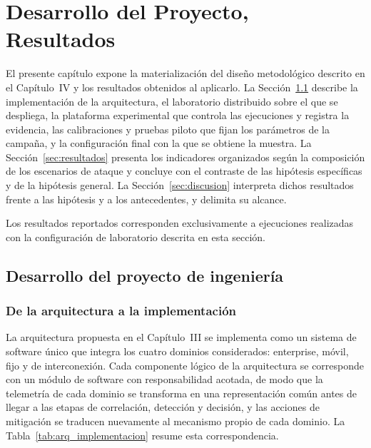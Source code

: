 \chapter{Desarrollo del Proyecto, Resultados}

El presente capítulo expone la materialización del diseño metodológico descrito en el Capítulo~IV y los resultados obtenidos al aplicarlo. La Sección~\ref{sec:desarrollo_ingenieria} describe la implementación de la arquitectura, el laboratorio distribuido sobre el que se despliega, la plataforma experimental que controla las ejecuciones y registra la evidencia, las calibraciones y pruebas piloto que fijan los parámetros de la campaña, y la configuración final con la que se obtiene la muestra. La Sección~\ref{sec:resultados} presenta los indicadores organizados según la composición de los escenarios de ataque y concluye con el contraste de las hipótesis específicas y de la hipótesis general. La Sección~\ref{sec:discusion} interpreta dichos resultados frente a las hipótesis y a los antecedentes, y delimita su alcance.

Los resultados reportados corresponden exclusivamente a ejecuciones realizadas con la configuración de laboratorio descrita en esta sección.

\section{Desarrollo del proyecto de ingeniería}
\label{sec:desarrollo_ingenieria}

\subsection{De la arquitectura a la implementación}
\label{subsec:arq_implementacion}

La arquitectura propuesta en el Capítulo~III se implementa como un sistema de software único que integra los cuatro dominios considerados: enterprise, móvil, fijo y de interconexión. Cada componente lógico de la arquitectura se corresponde con un módulo de software con responsabilidad acotada, de modo que la telemetría de cada dominio se transforma en una representación común antes de llegar a las etapas de correlación, detección y decisión, y las acciones de mitigación se traducen nuevamente al mecanismo propio de cada dominio. La Tabla~\ref{tab:arq_implementacion} resume esta correspondencia.

